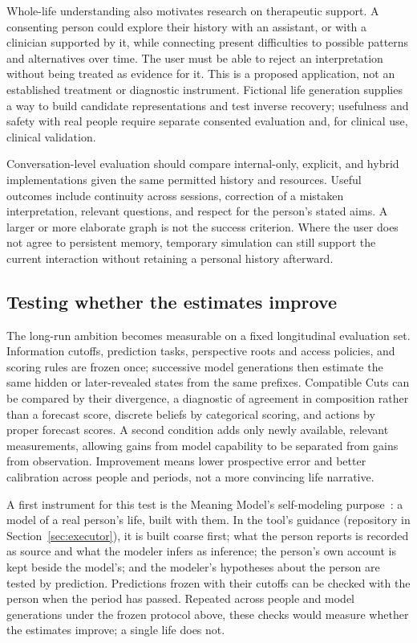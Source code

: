 \documentclass[10pt]{article}
\begin{document}
Whole-life understanding also motivates research on therapeutic support.
A consenting person could explore their history with an assistant, or with a
clinician supported by it, while connecting present difficulties to possible
patterns and alternatives over time. The user must be able to reject an
interpretation without being treated as evidence for it. This is a proposed
application, not an established treatment or diagnostic instrument. Fictional
life generation supplies a way to build candidate representations and test
inverse recovery; usefulness and safety with real people require separate
consented evaluation and, for clinical use, clinical validation.

Conversation-level evaluation should compare internal-only, explicit, and
hybrid implementations given the same permitted history and resources. Useful
outcomes include continuity across sessions, correction of a mistaken
interpretation, relevant questions, and respect for the person's stated aims.
A larger or more elaborate graph is not the success criterion. Where the user
does not agree to persistent memory, temporary simulation can still support
the current interaction without retaining a personal history afterward.

\subsection{Testing whether the estimates improve}

The long-run ambition becomes measurable on a fixed longitudinal evaluation
set. Information cutoffs, prediction tasks, perspective roots and access
policies, and scoring rules are
frozen once; successive model generations then estimate the same hidden or
later-revealed states from the same prefixes. Compatible Cuts can be compared
by their divergence, a diagnostic of agreement in composition rather than a
forecast score, discrete beliefs by categorical scoring, and actions
by proper forecast scores. A second condition adds only newly available,
relevant measurements, allowing gains from model capability to be separated
from gains from observation. Improvement means lower prospective error and
better calibration across people and periods, not a more convincing life
narrative.

A first instrument for this test is the Meaning Model's self-modeling
purpose~\cite{westerbergMeaning2026}: a model of a real person's life, built
with them. In the tool's guidance (repository in Section~\ref{sec:executor}),
it is built coarse first; what the person reports is recorded as source and
what the modeler infers as inference; the person's own account is kept beside
the model's; and the modeler's hypotheses about the person are tested by
prediction. Predictions frozen with their cutoffs can be checked with the
person when the period has passed. Repeated across people and model
generations under the frozen protocol above, these checks would measure
whether the estimates improve; a single life does not.
\end{document}
